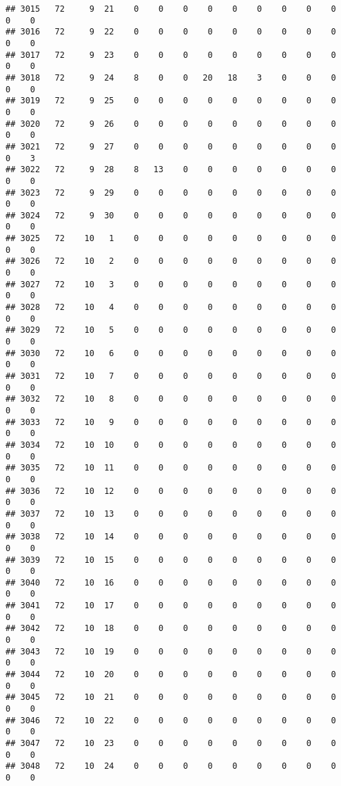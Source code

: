 \documentclass[]{article}
\begin{document}
\begin{verbatim}
## 3015   72     9  21    0    0    0    0    0    0    0    0    0    0    0
## 3016   72     9  22    0    0    0    0    0    0    0    0    0    0    0
## 3017   72     9  23    0    0    0    0    0    0    0    0    0    0    0
## 3018   72     9  24    8    0    0   20   18    3    0    0    0    0    0
## 3019   72     9  25    0    0    0    0    0    0    0    0    0    0    0
## 3020   72     9  26    0    0    0    0    0    0    0    0    0    0    0
## 3021   72     9  27    0    0    0    0    0    0    0    0    0    0    3
## 3022   72     9  28    8   13    0    0    0    0    0    0    0    0    0
## 3023   72     9  29    0    0    0    0    0    0    0    0    0    0    0
## 3024   72     9  30    0    0    0    0    0    0    0    0    0    0    0
## 3025   72    10   1    0    0    0    0    0    0    0    0    0    0    0
## 3026   72    10   2    0    0    0    0    0    0    0    0    0    0    0
## 3027   72    10   3    0    0    0    0    0    0    0    0    0    0    0
## 3028   72    10   4    0    0    0    0    0    0    0    0    0    0    0
## 3029   72    10   5    0    0    0    0    0    0    0    0    0    0    0
## 3030   72    10   6    0    0    0    0    0    0    0    0    0    0    0
## 3031   72    10   7    0    0    0    0    0    0    0    0    0    0    0
## 3032   72    10   8    0    0    0    0    0    0    0    0    0    0    0
## 3033   72    10   9    0    0    0    0    0    0    0    0    0    0    0
## 3034   72    10  10    0    0    0    0    0    0    0    0    0    0    0
## 3035   72    10  11    0    0    0    0    0    0    0    0    0    0    0
## 3036   72    10  12    0    0    0    0    0    0    0    0    0    0    0
## 3037   72    10  13    0    0    0    0    0    0    0    0    0    0    0
## 3038   72    10  14    0    0    0    0    0    0    0    0    0    0    0
## 3039   72    10  15    0    0    0    0    0    0    0    0    0    0    0
## 3040   72    10  16    0    0    0    0    0    0    0    0    0    0    0
## 3041   72    10  17    0    0    0    0    0    0    0    0    0    0    0
## 3042   72    10  18    0    0    0    0    0    0    0    0    0    0    0
## 3043   72    10  19    0    0    0    0    0    0    0    0    0    0    0
## 3044   72    10  20    0    0    0    0    0    0    0    0    0    0    0
## 3045   72    10  21    0    0    0    0    0    0    0    0    0    0    0
## 3046   72    10  22    0    0    0    0    0    0    0    0    0    0    0
## 3047   72    10  23    0    0    0    0    0    0    0    0    0    0    0
## 3048   72    10  24    0    0    0    0    0    0    0    0    0    0    0

\end{verbatim}
\end{document}
